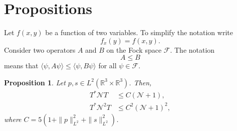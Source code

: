 \documentclass[a4paper,11pt]{article}
\newtheorem{prop}{Proposition}
\newcommand{\R}{\mathds{R}}
\newcommand{\N}{\mathcal{N}}
\begin{document}
\section{Propositions}


Let $f(x,y)$ be a function of two variables. To simplify the notation write
\begin{displaymath}
  f_x(y) = f(x,y).
\end{displaymath}
Consider two operators $A$ and $B$ on the Fock space $\mathcal{F}$. The
notation
\begin{displaymath}
  A \le B
\end{displaymath}
means that $\langle \psi, A \psi \rangle \le \langle \psi, B \psi \rangle$ for
all $\psi \in \mathcal{F}$.


\begin{prop}
  Let $p, s \in L^2(\R^3 \times \R^3)$. Then,
  \label{p:TNT}
  \begin{align}
    T^* \N T & \le C (\N+1), \label{TNT} \tag{i} \\
    T^* \N^2 T & \le C^2 (\N+1)^2, \label{TN2T} \tag{ii}
  \end{align}
  where $C = 5(1 + \| p \|_{L^2}^2 + \| s \|_{L^2}^2)$.
\end{prop}
\end{document}
